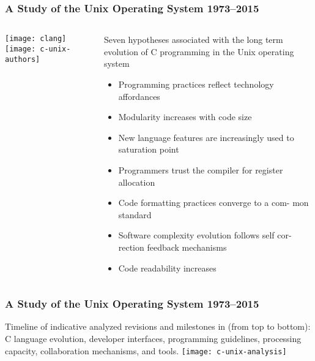 \begin{frame}[plain]
	\frametitle{A Study of the Unix Operating System 1973–2015}
	
	
	
	\begin{columns}
		
		\begin{column}{.3\textwidth}
			
			\texttt{[image: clang]}
			\texttt{[image: c-unix-authors]}
		\end{column}
		
		\begin{column}{.7\textwidth}
			
			
			Seven hypotheses associated with the long term evolution of C programming in		the Unix operating system
			
			\begin{itemize}
				\item  Programming practices reflect technology affordances
				
				\item  Modularity increases with code size
				
				\item  New language features are increasingly used
				to saturation point
				
				
				\item  Programmers trust the compiler for register
				allocation
				
				\item Code formatting practices converge to a com-
				mon standard
				
				\item  Software complexity evolution follows self cor-
				rection feedback mechanisms
				
				\item Code readability increases
				
			\end{itemize}
			
		\end{column}
		
		
	\end{columns}
	
	
\end{frame}


\begin{frame}[plain]
	\frametitle{A Study of the Unix Operating System 1973–2015}
	Timeline of indicative analyzed revisions and milestones in (from top to bottom): C language evolution, developer interfaces, programming guidelines, processing capacity, collaboration mechanisms, and tools.
	\texttt{[image: c-unix-analysis]}
	
\end{frame}	


